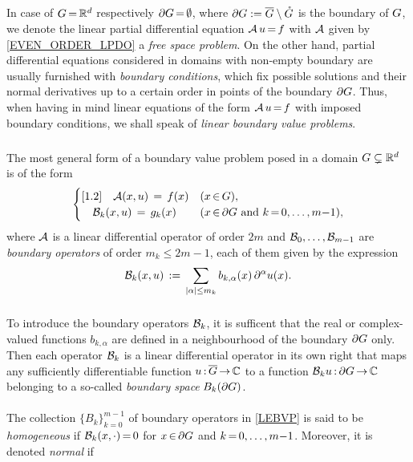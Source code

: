 \documentclass[11pt,twoside]{article}
\begin{document}
\subsection{} %
In case of $G {\,=\,} {\mathbb{R}}^d$ respectively $\partial G {\,=\,} \emptyset$,
where $\partial G := \overline{G} \setminus \mathring{G}$ is the boundary of $G$,
we denote the linear partial differential equation ${\mathcal{A}} \, u {\,=\,} f$
with ${\mathcal{A}}$ given by \eqref{EVEN_ORDER_LPDO} a \textit{free space problem}.
On the other hand,
partial differential equations considered in domains
with non-empty boundary are usually furnished with \textit{boundary conditions},
which fix possible solutions and their normal derivatives up to a certain order
in points of the boundary $\partial G$.
Thus,
when having in mind linear equations of the form ${\mathcal{A}}\,u {\,=\,} f$
with imposed boundary conditions,
we shall speak of \textit{linear boundary value problems}.

\subparagraph{} %
The most general form of a boundary value problem
posed in a domain $G \subsetneq {\mathbb{R}}^d$ is of the form
\begin{equation}\label{LEBVP}
\begin{cases}[1.2]
\quad {\mathcal{A}}(x,u)     \,=\, f(x)   & (x {\,\in\,} G),\\
\quad {\mathcal{B}}_k(x,u) \,=\, g_k(x) & (x {\,\in\,} \partial G \mbox{ and } k {\,=\,} 0,\ldots,m{-}1),\\
\end{cases}
\end{equation}
where ${\mathcal{A}}$ is a {linear} differential operator of order $2m$
and ${\mathcal{B}}_0,\ldots,{\mathcal{B}}_{m-1}$ are \textit{boundary operators}
of order $m_k \leq 2m{-}1$,
each of them given by the expression
\[
\BDO_k(x,u) \eqdef
\sum_{\abs{\alpha} \leq m_k} b_{k,\alpha}(x) \, \PA u(x).
\]

\subparagraph{}
To introduce the boundary operators ${\mathcal{B}}_k$,
it is sufficent that the real or complex-valued functions $b_{k,\alpha}$
are defined in a neighbourhood of the boundary $\partial G$ only.
Then each operator ${\mathcal{B}}_k$ is a linear differential operator in its own right
that maps any sufficiently differentiable function $u {\,:\,} \overline{G} {\,\to\,} {\mathbb{C}}$
to a function ${\mathcal{B}}_k u {\,:\,} \partial G {\,\to\,} {\mathbb{C}}$
belonging to a so-called \textit{boundary space} $B_k(\partial G)$.

\paragraph{} %
The collection $\{B_k\}_{k=0}^{m{-}1}$ of boundary operators in \eqref{LEBVP}
is said to be \textit{homogeneous}
if ${\mathcal{B}}_k(x,\cdot) {\,=\,} 0$ for $x {\,\in\,} \partial G$ and $k {\,=\,} 0,\ldots,m{-}1$.
Moreover,
it is denoted \textit{normal} if
\end{document}
